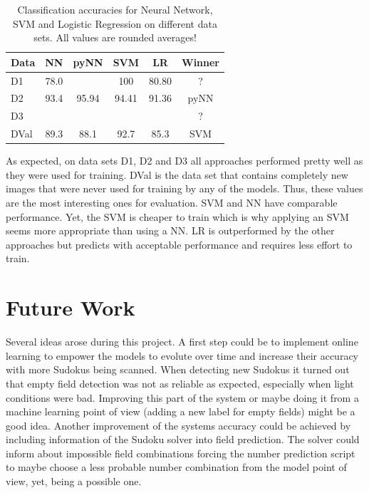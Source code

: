 \documentclass{article}
\begin{document}
\begin{table}[t]
\caption{Classification accuracies for Neural Network, SVM and Logistic Regression on different data sets. All values are rounded averages!}
\label{sample-table}
\vskip 0.15in
\begin{center}
\begin{small}
\begin{sc}
\begin{tabular}{lccccc}
\hline
\abovespace\belowspace
Data & NN & pyNN & SVM & LR & Winner \\
\hline
\abovespace
D1 		& 78.0 &  & 100 & 80.80 & ?\\
D2		& 93.4 & 95.94 & 94.41 & 91.36 & pyNN\\
D3		&  & & & & ? \\
\belowspace
DVal	& 89.3 & 88.1 & 92.7 & 85.3 & SVM\\
\hline
\end{tabular}
\end{sc}
\end{small}
\end{center}
\vskip -0.1in
\end{table}
As expected, on data sets D1, D2 and D3 all approaches performed pretty well as they were used for training. DVal is the data set that contains completely new images that were never used for training by any of the models. Thus, these values are the most interesting ones for evaluation. SVM and NN have comparable performance. Yet, the SVM is cheaper to train which is why applying an SVM seems more appropriate than using a NN. LR is outperformed by the other approaches but predicts with acceptable performance and requires less effort to train.

\section{Future Work}
Several ideas arose during this project. A first step could be to implement online learning to empower the models to evolute over time and increase their accuracy with more Sudokus being scanned. When detecting new Sudokus it turned out that empty field detection was not as reliable as expected, especially when light conditions were bad. Improving this part of the system or maybe doing it from a machine learning point of view (adding a new label for empty fields) might be a good idea. Another improvement of the systems accuracy could be achieved by including information of the Sudoku solver into field prediction. The solver could inform about impossible field combinations forcing the number prediction script to maybe choose a less probable number combination from the model point of view, yet, being a possible one.



\end{document}
